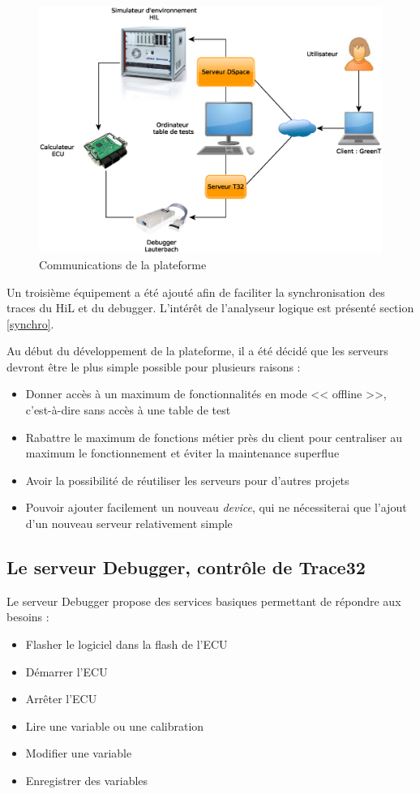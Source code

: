 \begin{figure}[H]
	\centering
	\includegraphics[width=15cm]{contents/images/network.eps}
	\caption{Communications de la plateforme}
	\label{fig:wbgt}
\end{figure}

\begin{remarque}
Un troisième équipement a été ajouté afin de faciliter la synchronisation des traces du HiL et du debugger. L'intérêt de l'analyseur logique est présenté section \ref{synchro}.
\end{remarque}


Au début du développement de la plateforme, il a été décidé que les serveurs devront être le plus simple possible pour plusieurs raisons
: 
\begin{itemize}
	\item Donner accès à un maximum de fonctionnalités en mode << offline >>, c'est-à-dire sans accès à une table de test
	\item Rabattre le maximum de fonctions métier près du client pour centraliser au maximum le fonctionnement et éviter la maintenance superflue
	\item Avoir la possibilité de réutiliser les serveurs pour d'autres projets
	\item Pouvoir ajouter facilement un nouveau \textit{device}, qui ne nécessiterai que l'ajout d'un nouveau serveur relativement simple
\end{itemize}

\subsection{Le serveur Debugger, contrôle de Trace32}\label{T32server}
Le serveur Debugger propose des services basiques permettant de répondre aux besoins :
\begin{itemize}
	\item Flasher le logiciel dans la flash de l'ECU
	\item Démarrer l'ECU
	\item Arrêter l'ECU
	\item Lire une variable ou une calibration
	\item Modifier une variable
	\item Enregistrer des variables
\end{itemize}~

